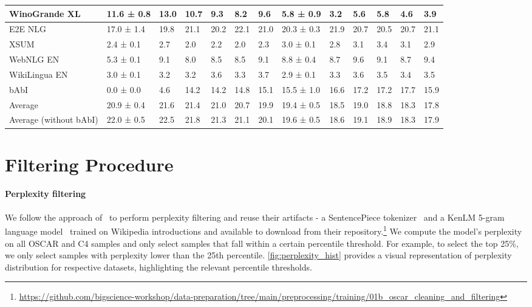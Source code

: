 \documentclass{article}
\begin{document}
\begin{table}[htbp]
{\begin{tabular}{l|l|lllll|l|lllll}
WinoGrande XL & 11.6 ± 0.8 & 13.0 & 10.7 & 9.3 & 8.2 & 9.6 & 5.8 ± 0.9 & 3.2 & 5.6 & 5.8 & 4.6 & 3.9 \\
\midrule
E2E NLG & 17.0 ± 1.4 & 19.8 & 21.1 & 20.2 & 22.1 & 21.0 & 20.3 ± 0.3 & 21.9 & 20.7 & 20.5 & 20.7 & 21.1 \\
XSUM & 2.4 ± 0.1 & 2.7 & 2.0 & 2.2 & 2.0 & 2.3 & 3.0 ± 0.1 & 2.8 & 3.1 & 3.4 & 3.1 & 2.9 \\
WebNLG EN & 5.3 ± 0.1 & 9.1 & 8.0 & 8.5 & 8.5 & 9.1 & 8.8 ± 0.4 & 8.7 & 9.6 & 9.1 & 8.7 & 9.4 \\
WikiLingua EN & 3.0 ± 0.1 & 3.2 & 3.2 & 3.6 & 3.3 & 3.7 & 2.9 ± 0.1 & 3.3 & 3.6 & 3.5 & 3.4 & 3.5 \\
\midrule
bAbI & 0.0 ± 0.0 & 4.6 & 14.2 & 14.2 & 14.8 & 15.1 & 15.5 ± 1.0 & 16.6 & 17.2 & 17.2 & 17.7 & 15.9 \\
\midrule
Average & 20.9 ± 0.4 & 21.6 & 21.4 & 21.0 & 20.7 & 19.9 & 19.4 ± 0.5 & 18.5 & 19.0 & 18.8 & 18.3 & 17.8 \\
Average (without bAbI) & 22.0 ± 0.5 & 22.5 & 21.8 & 21.3 & 21.1 & 20.1 & 19.6 ± 0.5 & 18.6 & 19.1 & 18.9 & 18.3 & 17.9 \\
\bottomrule
  \end{tabular}
  }
  \label{tab:2b8py}
\end{table}



\FloatBarrier

\section{Filtering Procedure}
\label{sec:filtering}

\paragraph{Perplexity filtering} We follow the approach of~\cite{laurencconbigscience} to perform perplexity filtering and reuse their artifacts - a SentencePiece tokenizer~\cite{kudo-richardson-2018-sentencepiece} and a KenLM 5-gram language model~\cite{heafield-2011-kenlm} trained on Wikipedia introductions and available to download from their repository.\footnote{\url{https://github.com/bigscience-workshop/data-preparation/tree/main/preprocessing/training/01b_oscar_cleaning_and_filtering}} We compute the model's perplexity on all OSCAR and C4 samples and only select samples that fall within a certain percentile threshold. For example, to select the top 25\%, we only select samples with perplexity lower than the 25th percentile. \autoref{fig:perplexity_hist} provides a visual representation of perplexity distribution for respective datasets, highlighting the relevant percentile thresholds.
\end{document}
